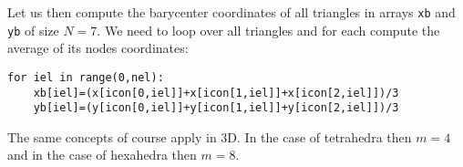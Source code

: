 Let us then compute the barycenter coordinates of all triangles in arrays 
{\tt xb} and {\tt yb} of size $N=7$.
We need to loop over all triangles and for each compute the average of 
its nodes coordinates:
\begin{verbatim}
for iel in range(0,nel):
    xb[iel]=(x[icon[0,iel]]+x[icon[1,iel]]+x[icon[2,iel]])/3
    yb[iel]=(y[icon[0,iel]]+y[icon[1,iel]]+y[icon[2,iel]])/3
\end{verbatim}

The same concepts of course apply in 3D. In the case of tetrahedra then $m=4$ and in the case of hexahedra then $m=8$.

